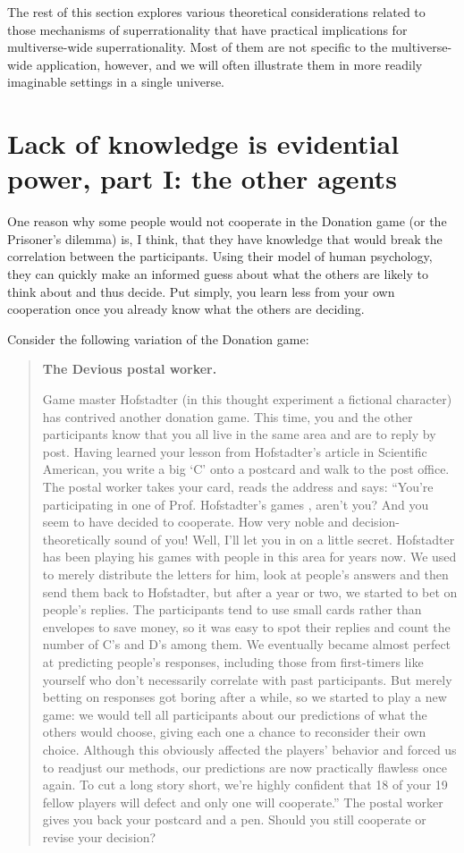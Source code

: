 \documentclass{book}
\begin{document}
The rest of this section explores various theoretical considerations related to those mechanisms of superrationality that have practical implications for multiverse-wide superrationality. Most of them are not specific to the multiverse-wide application, however, and we will often illustrate them in more readily imaginable settings in a single universe.


\section{Lack of knowledge is evidential power, part I: the other agents}
\label{Lack of knowledge is evidential power, part I: the other agents}

One reason why some people would not cooperate in the Donation game (or the Prisoner’s dilemma) is, I think, that they have knowledge that would break the correlation between the participants. Using their model of human psychology, they can quickly make an informed guess about what the others are likely to think about and thus decide. Put simply, you learn less from your own cooperation once you already know what the others are deciding.
 
Consider the following variation of the Donation game:

\begin{quote}
\hypertarget{deviouspostalworker}{\textbf{The Devious postal worker.}} Game master Hofstadter (in this thought experiment a fictional character) has contrived another donation game. This time, you and the other participants know that you all live in the same area and are to reply by post. Having learned your lesson from Hofstadter’s article in Scientific American, you write a big ‘C’ onto a postcard and walk to the post office. The postal worker takes your card, reads the address and says: “You’re participating in one of Prof. Hofstadter’s games , aren’t you? And you seem to have decided to cooperate. How very noble and decision-theoretically sound of you! Well, I’ll let you in on a little secret. Hofstadter has been playing his games with people in this area for years now. We used to merely distribute the letters for him, look at people’s answers and then send them back to Hofstadter, but after a year or two, we started to bet on people’s replies. The participants tend to use small cards rather than envelopes to save money, so it was easy to spot their replies and count the number of C’s and D’s among them. We eventually became almost perfect at predicting people’s responses, including those from first-timers like yourself who don’t necessarily correlate with past participants. But merely betting on responses got boring after a while, so we started to play a new game: we would tell all participants about our predictions of what the others would choose, giving each one a chance to reconsider their own choice. Although this obviously affected the players’ behavior and forced us to readjust our methods, our predictions are now practically flawless once again. To cut a long story short, we’re highly confident that 18 of your 19 fellow players will defect and only one will cooperate.” The postal worker gives you back your postcard and a pen. Should you still cooperate or revise your decision?
\end{quote}
\end{document}
